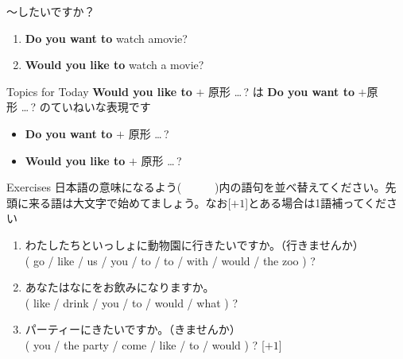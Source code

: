 \documentclass[aspectratio=169,xcolor={dvipsnames,table}]{beamer}
\begin{document}
\begin{frame}[plain]{～したいですか？}
\large
 \begin{enumerate}
  \item \textbf{Do you want to} watch amovie?
  \item \textbf{Would you like to} watch a movie?
 \end{enumerate}

\begin{block}{Topics for Today}\small
\textbf{Would you like to} $+$ 原形\,\,\ldots\,?\,\,は\,\,\textbf{Do you want to} $+$原形\,\,\ldots\,?\,\,のていねいな表現です
\begin{itemize}[square]\small
 \item \textbf{Do you want to} $+$ 原形 \ldots\,?
 \item \textbf{Would you like to} $+$ 原形 \ldots\,?
       \end{itemize}
\end{block}
\hfill{\scriptsize {}}

\end{frame}
\begin{frame}[plain]{Exercises}
日本語の意味になるよう(~~~~~~)内の語句を並べ替えてください。先頭に来る語は大文字で始めてましょう。なお[$+1$]とある場合は1語補ってください

 \begin{enumerate}
  \item わたしたちといっしょに動物園に行きたいですか。（行きませんか）\\
( go / like / us / you / to / to / with / would / the zoo ) ?\\
  \item あなたはなにをお飲みになりますか。\\
( like / drink / you / to / would / what ) ?\\
  \item パーティーにきたいですか。（きませんか）\\
( you / the party / come / like / to / would ) ? [$+1$]\\
\end{enumerate}
\hfill{\scriptsize {}}

\end{frame}
\end{document}
